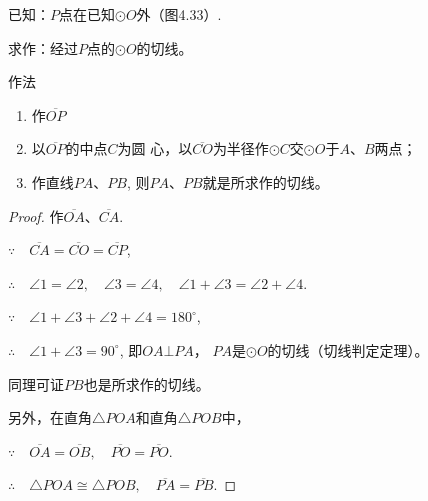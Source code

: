 \begin{example}
    已知：$P$点在已知$\odot O$外（图4.33）.

求作：经过$P$点的$\odot O$的切线。

作法
\begin{enumerate}
    \item 作$\overline{OP}$
    \item 以$\overline{OP}$的中点$C$为圆
心，以$\overline{CO}$为半径作$\odot C$交$\odot O$于$A$、$B$两点；
\item 作直线$PA$、$PB$, 则$PA$、$PB$就是所求作的切线。
\end{enumerate}
\end{example}

\begin{figure}[htp]
    \centering
{}
    \caption{}
\end{figure}



\begin{proof}
  作$\overline{OA}$、$\overline{CA}$.

$\because\quad  \overline{CA}=\overline{CO}=\overline{CP}$,

$\therefore\quad \angle 1=\angle 2,\quad \angle 3=\angle 4,\quad \angle 1+\angle 3=\angle 2+\angle 4$.

$\because\quad \angle 1+\angle 3+\angle 2+\angle 4=180^{\circ}$,

$\therefore\quad \angle 1+\angle 3=90^{\circ}$, 即$OA\bot PA$，
$PA$是$\odot O$的切线（切线判定定理）。

同理可证$PB$也是所求作的切线。

另外，在直角$\triangle POA$和直角$\triangle POB$中，

$\because\quad \overline{OA}=\overline{OB},\quad \overline{PO}=\overline{PO}$.

$\therefore\quad \triangle POA\cong \triangle POB,\quad 
\overline{PA}=\overline{PB}$.  
\end{proof}

